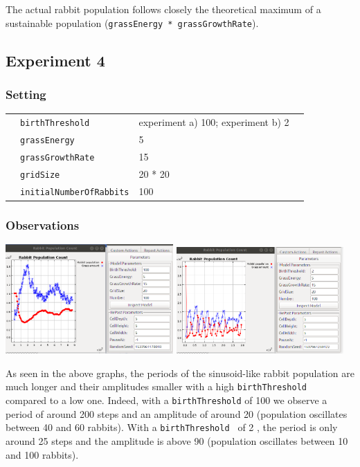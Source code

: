 \documentclass[11pt]{article}
\begin{document}
 The actual rabbit population follows closely the theoretical maximum of a 
 sustainable population (\texttt{grassEnergy * grassGrowthRate}).

 \subsection{Experiment 4}
 \subsubsection{Setting}
 \begin{table}[H]
  \begin{tabular}{llll}
   &\texttt{birthThreshold }  &experiment a) 100; experiment b) 2\\
   &\texttt{grassEnergy}  &5\\
   &\texttt{grassGrowthRate}  &15\\
   &\texttt{gridSize}  &20 * 20\\
   &\texttt{initialNumberOfRabbits}  &100
  \end{tabular}
 \end{table}

 \subsubsection{Observations}

 \includegraphics[width=0.48\textwidth]{slow_sinusoid.png}
 \includegraphics[width=0.48\textwidth]{fast_sinusoid.png}
 
 As seen in the above graphs, the periods of the sinusoid-like rabbit population 
 are much longer and their amplitudes smaller with a high \texttt{birthThreshold }
 compared to a low one. Indeed, with a \texttt{birthThreshold} of 100 we 
 observe a period of around 200 steps and an amplitude of 
 around 20 (population oscillates between 40 and 60 rabbits). 
 With a \texttt{birthThreshold } of 2 , the period is only  
 around 25 steps and the amplitude is above 
 90 (population oscillates between 10 and 100 rabbits).
\end{document}

